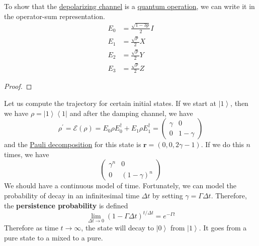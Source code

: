 \documentclass{article}
\newcommand{\ket}[1]{\ensuremath{\left|#1\right\rangle}}
\newcommand{\bra}[1]{\ensuremath{\left\langle#1\right|}}
\newcounter{example}[section]
\begin{document}
    \begin{lemma}
      \label{thm:operator-sum-representation-of-depolarizing}
      To show that the \hyperref[def:depolarizing-channel]{depolarizing channel} is a \hyperref[def:quantum-operation]{quantum operation}, we can write it in the operator-sum representation. 
      \begin{align}
        E_0 & = \frac{\sqrt{1 - 3p}}{2} I \\
        E_1 & = \frac{\sqrt{p}}{2} X \\ 
        E_2 & = \frac{\sqrt{p}}{2} Y \\ 
        E_3 & = \frac{\sqrt{p}}{2} Z 
      \end{align}
    \end{lemma}
    \begin{proof}
      
    \end{proof}

    \begin{example}
      \label{ex:trajectory-at-initial-states}
      Let us compute the trajectory for certain initial states. If we start at $\ket{1}$, then we have $\rho = \ket{1} \bra{1}$ and after the damping channel, we have 
      \begin{equation}
        \rho^\prime = \mathcal{E}(\rho) = E_0 \rho E_0^\dagger + E_1 \rho E_1^\dagger = \begin{pmatrix} \gamma & 0 \\ 0 & 1 - \gamma \end{pmatrix}
      \end{equation}
      and the \hyperref[def:pauli-decomposition]{Pauli decomposition} for this state is $\mathbf{r} = (0, 0, 2 \gamma - 1)$. If we do this $n$ times, we have 
      \begin{equation}
        \begin{pmatrix} \gamma^n & 0 \\ 0 & (1 - \gamma)^n \end{pmatrix}
      \end{equation}
      We should have a continuous model of time. Fortunately, we can model the probability of decay in an infinitesimal time $\Delta t$ by setting $\gamma = \Gamma \Delta t$. Therefore, the \textbf{persistence probability} is defined 
      \begin{equation}
        \lim_{\Delta t \rightarrow 0} (1 - \Gamma \Delta t)^{t / \Delta t} = e^{-\Gamma t}
      \end{equation}
      Therefore as time $t \rightarrow \infty$, the state will decay to $\ket{0}$ from $\ket{1}$. It goes from a pure state to a mixed to a pure. 
    \end{example}
\end{document}
